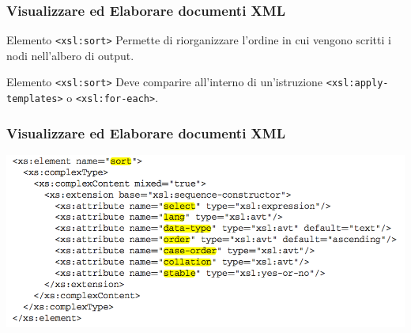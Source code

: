 
\begin{frame}
    \frametitle{Visualizzare ed Elaborare documenti XML}
    \addtocounter{nframe}{1}
    

     \begin{block}{Elemento \texttt{<xsl:sort>}}
        Permette di riorganizzare l’ordine in cui vengono scritti i nodi nell’albero di output.
     \end{block}

     \begin{block}{Elemento \texttt{<xsl:sort>}}
        Deve comparire all’interno di un’istruzione \texttt{<xsl:apply-templates>} o \texttt{<xsl:for-each>}.
     \end{block}

\end{frame}

\begin{frame}
    \frametitle{Visualizzare ed Elaborare documenti XML}
    \addtocounter{nframe}{1}
    
    \begin{center}
        \includegraphics[width=.95\textwidth]{imgs/Schema-sort.png}
    \end{center}

\end{frame}


